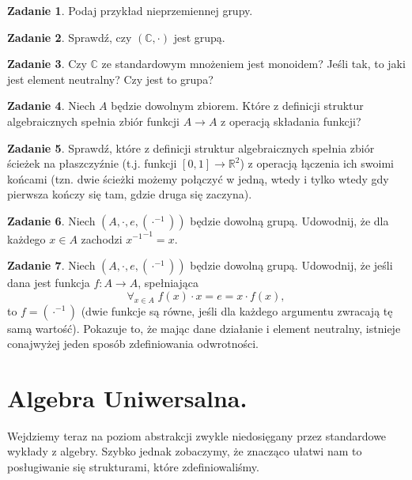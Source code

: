 \documentclass{article}
\theoremstyle{definition}
\newtheorem{exercise}{Zadanie}[section]
\begin{document}
\begin{exercise}
	Podaj przykład nieprzemiennej grupy.
\end{exercise}

\begin{exercise}
	Sprawdź, czy $(\mathbb{C}, \cdot)$ jest grupą.
\end{exercise}

\begin{exercise}
	Czy $\mathbb{C}$ ze standardowym mnożeniem jest monoidem? Jeśli tak, to jaki jest element neutralny? Czy jest to grupa?
\end{exercise}

\begin{exercise}
	Niech $A$ będzie dowolnym zbiorem.
	Które z definicji struktur algebraicznych spełnia zbiór funkcji $A \to A$ z operacją składania funkcji?
\end{exercise}

\begin{exercise}
	Sprawdź, które z definicji struktur algebraicznych spełnia zbiór ścieżek na płaszczyźnie (t.j. funkcji $[0, 1] \to \mathbb{R}^2$) z operacją łączenia ich swoimi końcami (tzn. dwie ścieżki możemy połączyć w jedną, wtedy i tylko wtedy gdy pierwsza kończy się tam, gdzie druga się zaczyna).
\end{exercise}

\begin{exercise}
    Niech $(A, \cdot, e, (\cdot^{-1}))$ będzie dowolną grupą.
    Udowodnij, że dla każdego $x \in A$ zachodzi ${x^{-1}}^{-1} = x$.
\end{exercise}


\begin{exercise}
    Niech $(A, \cdot, e, (\cdot^{-1}))$ będzie dowolną grupą.
    Udowodnij, że jeśli dana jest funkcja $f: A \to A$, spełniająca
    \begin{equation*}
        \forall_{x\in A}\; f(x) \cdot x = e = x \cdot f(x),
    \end{equation*}
    to $f = (\cdot^{-1})$ (dwie funkcje są równe, jeśli dla każdego argumentu zwracają tę samą wartość).
    Pokazuje to, że mając dane działanie i element neutralny,
        istnieje conajwyżej jeden sposób zdefiniowania odwrotności.
\end{exercise}

\section{Algebra Uniwersalna.}
Wejdziemy teraz na poziom abstrakcji zwykle niedosięgany przez standardowe wykłady z algebry.
Szybko jednak zobaczymy,
że znacząco ułatwi nam to posługiwanie się strukturami,
które zdefiniowaliśmy.
\end{document}

